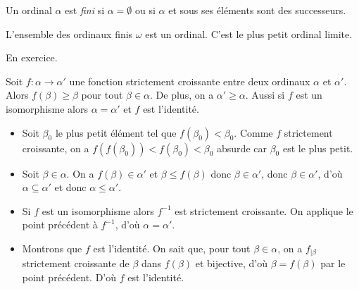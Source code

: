 \documentclass[./main]{subfiles}
\begin{document}
  \begin{defn}
    Un ordinal $\alpha$ est \textit{fini} si $\alpha = \emptyset$ ou si $\alpha$ et sous ses éléments sont des successeurs.
  \end{defn}

  \begin{prop}
    L'ensemble des ordinaux finis $\omega$ est un ordinal. C'est le plus petit ordinal limite.
  \end{prop}
  \begin{prv}
    En exercice.
  \end{prv}

  \begin{lem}
    Soit $f : \alpha \to \alpha'$ une fonction strictement croissante entre deux ordinaux $\alpha$ et $\alpha'$.
    Alors $f(\beta) \ge \beta$ pour tout $\beta \in \alpha$.
    De plus, on a $\alpha' \ge \alpha$.
    Aussi si $f$ est un isomorphisme alors $\alpha = \alpha'$ et  $f$ est l'identité.
  \end{lem}

  \begin{prv}
    \begin{itemize}
      \item Soit $\beta_0$ le plus petit élément tel que $f(\beta_0) < \beta_0$.
        Comme $f$ strictement croissante, on a $f(f(\beta_0)) < f(\beta_0) < \beta_0$ absurde car $\beta_0$ est le plus petit.
      \item Soit $\beta \in \alpha$. On a $f(\beta) \in \alpha'$ et $\beta \le f(\beta)$ donc $\beta \in \alpha'$, donc $\beta \in \alpha'$, d'où $\alpha \subseteq \alpha'$ et donc $\alpha \le \alpha'$.
      \item Si $f$ est un isomorphisme alors $f^{-1}$ est strictement croissante.
        On applique le point précédent à $f^{-1}$, d'où $\alpha = \alpha'$.
      \item Montrons que $f$ est l'identité.
        On sait que, pour tout $\beta \in \alpha$, on a $f_{|\beta}$ strictement croissante de $\beta$ dans $f(\beta)$ et bijective, d'où $\beta = f(\beta)$ par le point précédent.
        D'où $f$ est l'identité.
    \end{itemize}
  \end{prv}
\end{document}

